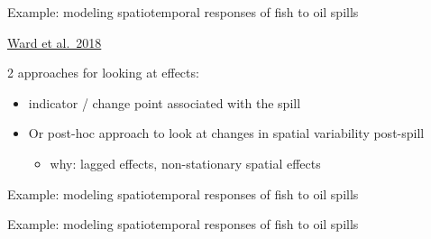 \documentclass[ignorenonframetext,]{beamer}
\providecommand{\tightlist}{%
  \setlength{\itemsep}{0pt}\setlength{\parskip}{0pt}}
\begin{document}
\begin{frame}{Example: modeling spatiotemporal responses of fish to oil
spills}
\protect\hypertarget{example-modeling-spatiotemporal-responses-of-fish-to-oil-spills}{}

\href{https://link.springer.com/article/10.1007\%2Fs10661-018-6912-z}{Ward
et al.~2018}

2 approaches for looking at effects:

\begin{itemize}
\item
  indicator / change point associated with the spill
\item
  Or post-hoc approach to look at changes in spatial variability
  post-spill

  \begin{itemize}
  \tightlist
  \item
    why: lagged effects, non-stationary spatial effects
  \end{itemize}
\end{itemize}

\end{frame}

\begin{frame}{Example: modeling spatiotemporal responses of fish to oil
spills}
\protect\hypertarget{example-modeling-spatiotemporal-responses-of-fish-to-oil-spills-1}{}

\end{frame}

\begin{frame}{Example: modeling spatiotemporal responses of fish to oil
spills}
\protect\hypertarget{example-modeling-spatiotemporal-responses-of-fish-to-oil-spills-2}{}

\end{frame}
\end{document}
